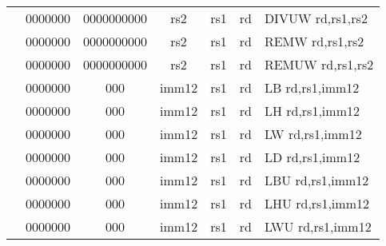 \begin{table}[p]
\begin{small}
\begin{center}
\begin{tabular}{rcccccccccl}
&
\multicolumn{1}{|c|}{0000000} &
\multicolumn{5}{c|}{0000000000} &
\multicolumn{1}{c|}{rs2} &
\multicolumn{1}{c|}{rs1} &
\multicolumn{1}{c|}{rd} & DIVUW rd,rs1,rs2 \\
\cline{2-10}
  

&
\multicolumn{1}{|c|}{0000000} &
\multicolumn{5}{c|}{0000000000} &
\multicolumn{1}{c|}{rs2} &
\multicolumn{1}{c|}{rs1} &
\multicolumn{1}{c|}{rd} & REMW rd,rs1,rs2 \\
\cline{2-10}
  

&
\multicolumn{1}{|c|}{0000000} &
\multicolumn{5}{c|}{0000000000} &
\multicolumn{1}{c|}{rs2} &
\multicolumn{1}{c|}{rs1} &
\multicolumn{1}{c|}{rd} & REMUW rd,rs1,rs2 \\
\cline{2-10}
  

&
\multicolumn{1}{|c|}{0000000} &
\multicolumn{2}{c|}{000} &
\multicolumn{4}{c|}{imm12} &
\multicolumn{1}{c|}{rs1} &
\multicolumn{1}{c|}{rd} & LB rd,rs1,imm12 \\
\cline{2-10}
  

&
\multicolumn{1}{|c|}{0000000} &
\multicolumn{2}{c|}{000} &
\multicolumn{4}{c|}{imm12} &
\multicolumn{1}{c|}{rs1} &
\multicolumn{1}{c|}{rd} & LH rd,rs1,imm12 \\
\cline{2-10}
  

&
\multicolumn{1}{|c|}{0000000} &
\multicolumn{2}{c|}{000} &
\multicolumn{4}{c|}{imm12} &
\multicolumn{1}{c|}{rs1} &
\multicolumn{1}{c|}{rd} & LW rd,rs1,imm12 \\
\cline{2-10}
  

&
\multicolumn{1}{|c|}{0000000} &
\multicolumn{2}{c|}{000} &
\multicolumn{4}{c|}{imm12} &
\multicolumn{1}{c|}{rs1} &
\multicolumn{1}{c|}{rd} & LD rd,rs1,imm12 \\
\cline{2-10}
  

&
\multicolumn{1}{|c|}{0000000} &
\multicolumn{2}{c|}{000} &
\multicolumn{4}{c|}{imm12} &
\multicolumn{1}{c|}{rs1} &
\multicolumn{1}{c|}{rd} & LBU rd,rs1,imm12 \\
\cline{2-10}
  

&
\multicolumn{1}{|c|}{0000000} &
\multicolumn{2}{c|}{000} &
\multicolumn{4}{c|}{imm12} &
\multicolumn{1}{c|}{rs1} &
\multicolumn{1}{c|}{rd} & LHU rd,rs1,imm12 \\
\cline{2-10}
  

&
\multicolumn{1}{|c|}{0000000} &
\multicolumn{2}{c|}{000} &
\multicolumn{4}{c|}{imm12} &
\multicolumn{1}{c|}{rs1} &
\multicolumn{1}{c|}{rd} & LWU rd,rs1,imm12 \\
\cline{2-10}
  


\end{tabular}
\end{center}
\end{small}
\end{table}
